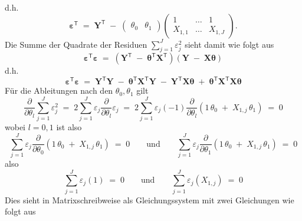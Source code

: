 d.h.
\begin{equation}
\boldsymbol{\varepsilon}^\mathsf{T} \; = \;
\mathbf{Y}^\mathsf{T}
\; - \;
\left(
\begin{array}{cc}
\theta_0 &
\theta_1
\end{array}
\right) \left(
\begin{array}{ccc}
1 &  \dots & 1 \\
X_{1,1} & \dots & X_{1,J}
\end{array}
\right).
\label{linearRegressionGeradeUmform}
\end{equation}
Die Summe der Quadrate der Residuen $\sum_{j=1}^J \varepsilon_j^2$  sieht damit wie
folgt aus
\begin{equation}
\boldsymbol{\varepsilon}^\mathsf{T}  \boldsymbol{\varepsilon} \; = \;
\left(
\mathbf{Y}^\mathsf{T}
\; - \;
\boldsymbol{\theta}^\mathsf{T} \mathbf{X}^\mathsf{T} \right)
\left(
\mathbf{Y}
\; - \;
\mathbf{X} \boldsymbol{\theta} \right)
\end{equation}
d.h.
\begin{equation}
\boldsymbol{\varepsilon}^\mathsf{T}  \boldsymbol{\varepsilon} \; = \;
\mathbf{Y}^\mathsf{T} \mathbf{Y}
\; - \;
\boldsymbol{\theta}^\mathsf{T} \mathbf{X}^\mathsf{T}  \mathbf{Y}
\; - \;
\mathbf{Y}^\mathsf{T}  \mathbf{X} \boldsymbol{\theta}
\; + \;
\boldsymbol{\theta}^\mathsf{T} \mathbf{X}^\mathsf{T} \mathbf{X} \boldsymbol{\theta}
\end{equation}
Für die Ableitungen nach den $\theta_0, \theta_1$ gilt
\begin{equation}
\frac{\partial}{\partial \theta_l} \sum_{j=1}^J \varepsilon_j^2 \; = \;
2 \sum_{j=1}^J \varepsilon_j \frac{\partial}{\partial \theta_l} \varepsilon_j \; = \;
2 \sum_{j=1}^J \varepsilon_j (-1) \frac{\partial}{\partial \theta_l}(1 \, \theta_0 \; + \;  X_{1,j} \, \theta_1) \; = \; 0
\end{equation}
wobei $l = 0,1$ ist also
\begin{equation}
\sum_{j=1}^J \varepsilon_j  \frac{\partial}{\partial \theta_0}(1 \, \theta_0 \; + \;  X_{1,j} \, \theta_1)  \; = \; 0 \qquad \mathrm{und} \qquad
\sum_{j=1}^J \varepsilon_j  \frac{\partial}{\partial \theta_1}(1 \, \theta_0 \; + \;  X_{1,j} \, \theta_1)  \; = \; 0
\end{equation}
also
\begin{equation}
\sum_{j=1}^J \varepsilon_j (1) \; = \; 0 \qquad \mathrm{und}  \qquad
\sum_{j=1}^J \varepsilon_j ( X_{1,j})  \; = \; 0
\end{equation}
Dies sieht in Matrixschreibweise als Gleichungssystem mit zwei Gleichungen wie folgt aus
